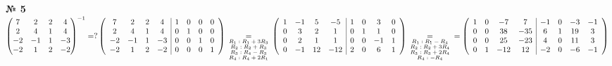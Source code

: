 \documentclass[a4paper, 12pt]{article}
\newenvironment{task}[1][0]{\vspace{.5cm} {\textbf{№ #1} \vspace{.5cm}\\ }}{}
\begin{document}
\begin{task}[5]
$
\begin{pmatrix}
	7 & 2 & 2 & 4\\
	2 & 4 & 1 & 4\\
	-2 & -1 & 1 & -3\\
	-2 & 1 & 2 & -2\\
\end{pmatrix}^{-1}=?\vspace{.3cm}\\
\left(
\begin{array}{cccc|cccc}
	7 & 2 & 2 & 4 &    1 & 0 & 0 & 0\\
	2 & 4 & 1 & 4 &    0 & 1 & 0 & 0\\
	-2 & -1 & 1 & -3 & 0 & 0 & 1 & 0\\
	-2 & 1 & 2 & -2  & 0 & 0 & 0 & 1\\
\end{array}
\right) \: \underset{
\begin{subarray}{c}
	\text{$R_1: R_1 + 3R_3$}\\
	\text{$R_2: R_2 + R_3$}\\
	\text{$R_3: R_4-R_3$}\\
	\text{$R_4: R_4+2R_1$}\\
\end{subarray}
}{=} \:
\left(
\begin{array}{cccc|cccc}
	1 & -1 & 5 & -5 & 1 & 0 & 3 & 0\\
	0 & 3 & 2 & 1 & 0 & 1 & 1 & 0\\
	0 & 2 & 1 & 1 & 0 & 0 & -1 & 1\\
	0 & -1 & 12 & -12 & 2 & 0 & 6 & 1\\
\end{array}
\right) \: \underset{
\begin{subarray}{c}
	\text{$R_1: R_1-R_4$}\\
	\text{$R_2: R_2+3R_4$}\\
	\text{$R_3: R_3+2R_4$}\\
	\text{$R_4: -R_4$}\\
\end{subarray}
}{=}\\=
\left(
\begin{array}{cccc|cccc}
	1 & 0 & -7 & 7 & -1 & 0 & -3 & -1\\
	0 & 0 & 38 & -35 & 6 & 1 & 19 & 3\\
	0 & 0 & 25 & -23 & 4 & 0 & 11 & 3\\
	0 & 1 & -12 & 12 & -2 & 0 & -6 & -1\\
\end{array}
\right) \:
$
\end{task}
\end{document}
